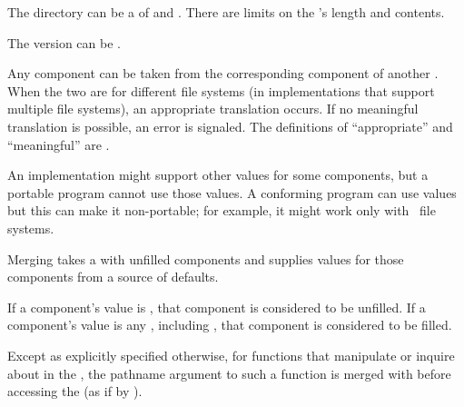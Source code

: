 \itemitem{\bull}
  The directory can be a  of  and .
  There are  limits on the 's
  length and contents.
  
\itemitem{\bull}
  The version can be .
 
\itemitem{\bull}
  Any component can be taken 
  from the corresponding component of another .
  When the two  are for different file systems
    (in implementations that support multiple file systems),
  an appropriate translation occurs.
  If no meaningful translation is possible,
  an error is signaled.
  The definitions of ``appropriate'' and ``meaningful'' 
  are .
  
\itemitem{\bull}
  An implementation might support other values for some components,
  but a portable program cannot use those values.
  A conforming program can use  values
  but this can make it non-portable;
  for example, it might work only with \Unix\ file systems.
\endlist                                   


\endsubsubsection%


\endSubsection%


Merging takes a  with unfilled components
and supplies values for those components from a source of defaults.

If a component's value is \nil, that component is considered to be unfilled.
If a component's value is any  , 
including , that component is considered to be filled.

Except as explicitly specified otherwise,
for functions that manipulate or inquire about  in the ,
the pathname argument to such a function
is merged with  before accessing the 
(as if by ).

